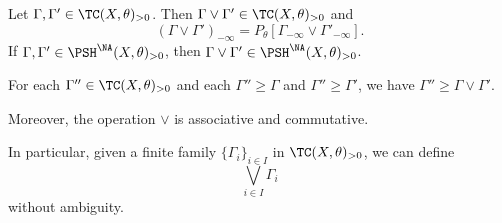 \begin{corollary}\label{cor:testcurvlorprop}
    Let $\Gamma,\Gamma'\in \TC(X,\theta)_{>0}$. Then $\Gamma\lor \Gamma'\in\TC(X,\theta)_{>0}$ and
    \begin{equation}\label{eq:GammalorGammapminfty}
    (\Gamma\lor \Gamma')_{-\infty}=P_{\theta}\left[\Gamma_{-\infty}\lor \Gamma'_{-\infty}\right].
    \end{equation}
    If $\Gamma,\Gamma'\in \PSH^{\NA}(X,\theta)_{>0}$, then $\Gamma\lor \Gamma'\in\PSH^{\NA}(X,\theta)_{>0}$.

    For each $\Gamma''\in \TC(X,\theta)_{>0}$ and each $\Gamma''\geq \Gamma$ and $\Gamma''\geq \Gamma'$, we have $\Gamma''\geq \Gamma\lor \Gamma'$.

    Moreover, the operation $\lor$ is associative and commutative.
\end{corollary}
In particular, given a finite family $\{\Gamma_i\}_{i\in I}$ in $\TC(X,\theta)_{>0}$, we can define
\[
\bigvee_{i\in I}\Gamma_i
\]
without ambiguity.

